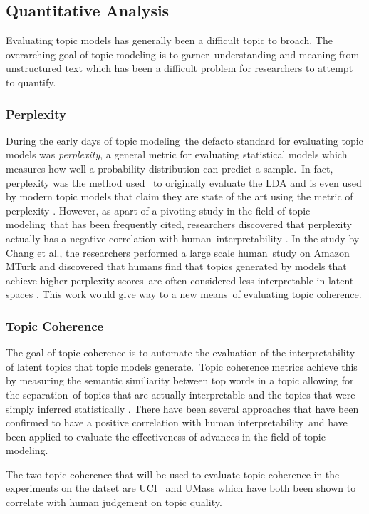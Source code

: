 \documentclass[letterpaper,12pt]{article}
\begin{document}
\subsection{Quantitative Analysis}
Evaluating topic models has generally been a difficult topic to broach. The overarching goal of topic modeling is to garner\
understanding and meaning from unstructured text which has been a difficult problem for researchers to attempt to quantify.\

\subsubsection{Perplexity}
During the early days of topic modeling\
the defacto standard for evaluating topic models was \emph{perplexity}, a general metric for evaluating statistical models
which measures how well a probability distribution can predict a sample.\ In fact, perplexity was the method used \	
to originally evaluate the LDA and is even used by modern topic models that claim they are state of the art using the
metric of perplexity \cite{kesiraju2019learning}. However, as apart of a pivoting study in the field of topic modeling\
that has been frequently cited, researchers discovered that perplexity actually has a negative correlation with human\
interpretability \cite{chang2009reading}. In the study by Chang et al., the researchers performed a large scale human\
study on Amazon MTurk and discovered that humans find that topics generated by models that achieve higher perplexity scores\
are often considered less interpretable in latent spaces \cite{chang2009reading}. This work would give way to a new means\
of evaluating topic coherence.

\subsubsection{Topic Coherence}
The goal of topic coherence is to automate the evaluation of the interpretability of latent topics that topic models generate.\
Topic coherence metrics achieve this by measuring the semantic similiarity between top words in a topic allowing for the separation\
of topics that are actually interpretable and the topics that were simply inferred statistically \cite{stevens2012exploring}.
There have been several approaches that have been confirmed to have a positive correlation with human interpretability\
and have been applied to evaluate the effectiveness of advances in the field of topic modeling.

The two topic coherence that will be used to evaluate topic coherence in the experiments on the datset are UCI \cite{newman2010automatic}\
and UMass \cite{mimno2011optimizing} which have both been shown to correlate with human judgement on topic quality.
\end{document}
